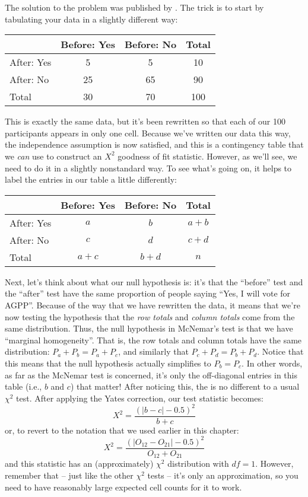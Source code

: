 The solution to the problem was published by . The trick is to start by tabulating your data in a slightly different way:
\begin{center}
\begin{tabular}{l|cc|c}
& Before: Yes & Before: No & Total \\ \hline
After: Yes   & 5 & 5 & 10 \\
After: No    & 25 & 65 & 90 \\ \hline
Total        & 30 & 70 & 100
\end{tabular}
\end{center}
\noindent
This is exactly the same data, but it's been rewritten so that each of our 100 participants appears in only one cell. Because we've written our data this way, the independence assumption is now satisfied, and this is a contingency table that we {\it can} use to construct an $X^2$ goodness of fit statistic. However, as we'll see, we need to do it in a slightly nonstandard way. To see what's going on, it helps to label the entries in our table a little differently:
\begin{center}
\begin{tabular}{l|cc|c}
& Before: Yes & Before: No & Total \\ \hline
After: Yes   & $a$ & $b$ & $a+b$ \\
After: No & $c$ & $d$ & $c+d$ \\ \hline
Total & $a+c$ & $b+d$ & $n$
\end{tabular}
\end{center}
\noindent
Next, let's think about what our null hypothesis is: it's that the ``before'' test and the ``after'' test have the same proportion of people saying ``Yes, I will vote for AGPP''. Because of the way that we have rewritten the data, it means that we're now testing the hypothesis that the {\it row totals} and {\it column totals} come from the same distribution. Thus, the null hypothesis in McNemar's test is that we have ``marginal homogeneity''. That is, the row totals and column totals have the same distribution: $P_a + P_b = P_a + P_c$, and similarly that $P_c + P_d = P_b + P_d$. Notice that this means that the null hypothesis actually simplifies to $P_b = P_c$. In other words, as far as the McNemar test is concerned, it's only the off-diagonal entries in this table (i.e., $b$ and $c$) that matter! After noticing this, the  is no different to a usual $\chi^2$ test. After applying the Yates correction, our test statistic becomes:
$$
X^2 = \frac{(|b-c| - 0.5)^2}{b+c}
$$
or, to revert to the notation that we used earlier in this chapter:
$$
X^2 = \frac{(|O_{12}-O_{21}| - 0.5)^2}{O_{12} + O_{21}}
$$
and this statistic has an (approximately) $\chi^2$ distribution with $df=1$. However, remember that -- just like the other $\chi^2$ tests -- it's only an approximation, so you need to have reasonably large expected cell counts for it to work.


